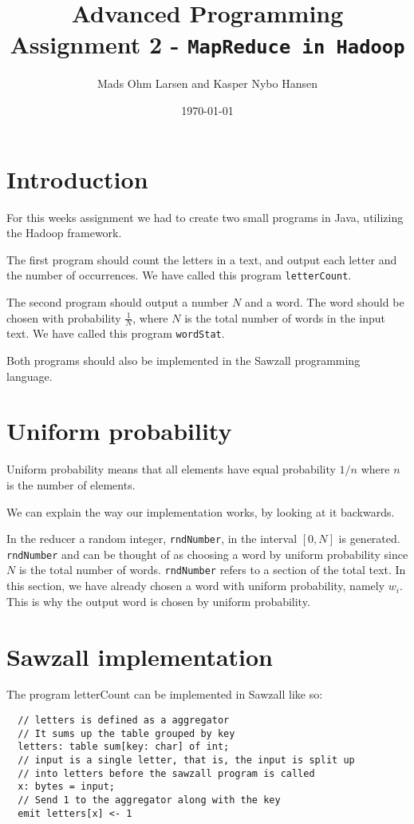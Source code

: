 \documentclass[10pt, a4paper]{article}
\title{Advanced Programming \\\small{Assignment 2} - \texttt{MapReduce in Hadoop}}
\author{Mads Ohm Larsen and Kasper Nybo Hansen}
\date{\today}
\begin{document}
	
\maketitle

\section{Introduction} %
\label{sec:introduction}
For this weeks assignment we had to create two small programs in Java, utilizing the Hadoop framework. 

The first program should count the letters in a text, and output each letter and the number of occurrences. 
We have called this program \texttt{letterCount}.

The second program should output a number $N$ and a word.
The word should be chosen with probability $\frac{1}{N}$, where $N$ is the total number of words in the input text. 
We have called this program \texttt{wordStat}.

Both programs should also be implemented in the Sawzall programming language.

\section{Uniform probability} %
\label{sec:uniform_probability}
Uniform probability means that all elements have equal probability $1/n$ where $n$ is the number of elements.

We can explain the way our implementation works, by looking at it backwards. 

In the reducer a random integer, \texttt{rndNumber}, in the interval $[0,N]$ is generated. 
\texttt{rndNumber} and can be thought of as choosing a word by uniform probability since $N$ is the total number of words. 
\texttt{rndNumber} refers to a section of the total text. 
In this section, we have already chosen a word with uniform probability, namely $w_i$. 
This is why the output word is chosen by uniform probability.

\pagebreak
\section{Sawzall implementation} %
\label{sec:sawzall_implementation}
The program letterCount can be implemented in Sawzall like so: 

\begin{lstlisting}
  // letters is defined as a aggregator
  // It sums up the table grouped by key
  letters: table sum[key: char] of int;
  // input is a single letter, that is, the input is split up 
  // into letters before the sawzall program is called
  x: bytes = input;
  // Send 1 to the aggregator along with the key
  emit letters[x] <- 1  
\end{lstlisting}
\end{document}
